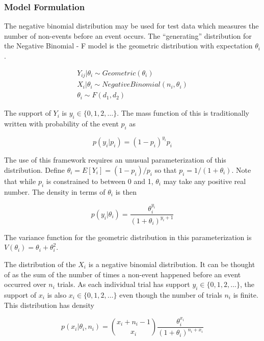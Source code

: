 \documentclass[12pt,epsfig]{article}
\begin{document}
\subsubsection{Model Formulation}

The negative binomial distribution may be used for test data which measures the number of non-events before an event occurs. The ``generating'' distribution for the Negative Binomial - F model is the geometric distribution with expectation $\theta_i$.

\begin{gather*}
    Y_{ij} | \theta_i \sim Geometric(\theta_i)\\
    X_{i} | \theta_i \sim Negative Binomial(n_i, \theta_i)\\
    \theta_i \sim F(d_1, d_2)
\end{gather*}

\noindent The support of $Y_i$ is $y_i \in \{0, 1, 2, \ldots\}$. The mass function of this is traditionally written with probability of the event $p_i$ as

\begin{equation*}
    p(y_i | p_i) = (1-p_i)^{y_i} p_i
\end{equation*}

The use of this framework requires an unusual parameterization of this distribution. Define $\theta_i = E[Y_i] = (1-p_i)/p_i$ so that $p_i = 1/(1 + \theta_i)$. Note that while $p_i$ is constrained to between 0 and 1, $\theta_i$ may take any positive real number. The density in terms of $\theta_i$ is then

\begin{equation*}
    p(y_i | \theta_i) = \dfrac{\theta_i^{y_i}}{(1 + \theta_i)^{y_i + 1}}    
\end{equation*}

\noindent \noindent The variance function for the geometric distribution in this parameterization is $V(\theta_i) = \theta_i + \theta_i^2$.

The distribution of the $X_i$ is a negative binomial distribution. It can be thought of as the sum of the number of times a non-event happened before an event occurred over $n_i$ trials. As each individual trial has support $y_i \in \{0, 1, 2, \ldots\}$, the support of $x_i$ is also $x_i \in \{0, 1, 2, \ldots\}$ even though the number of trials $n_i$ is finite. This distribution has density

\begin{equation*}
    p(x_i | \theta_i, n_i) = {x_i + n_i - 1 \choose x_i} \dfrac{\theta_i^{x_i}}{(1 + \theta_i)^{n_i + x_i}}
\end{equation*}
\end{document}
